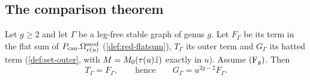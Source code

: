 \subsection{The comparison theorem}
\label{sec:flh-thm}

\begin{thm}
\label{thm:flh-main}
Let $g\geq 2$ and let $\Gamma$ be a leg-free stable graph of genus $g$. Let $F_\Gamma$ be its term in the flat sum of $P_{\mathrm{can}}.\Omega^{\mathrm{mod}}_{v(u)}$ (\cref{def:red-flatsum}), $T_\Gamma$ its outer term and $G_\Gamma$ its hatted term (\cref{def:set-outer}, with $M=M_{0}(\tau(u)\hat{z})$ exactly in $u$). Assume $(\mathrm{F}_{g})$. Then
\begin{equation}
\label{eq:flh-main}
T_\Gamma=F_\Gamma,\qquad\text{hence}\qquad G_\Gamma=u^{2g-2}F_\Gamma .
\end{equation}
\end{thm}

